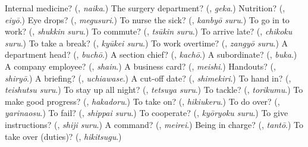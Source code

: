 \begin{tcolorbox}[breakable,colback=teal!4,colframe=teal!35!black,title={Before you move on}]
Internal medicine? (\textbf{}, \emph{naika}.) The surgery department? (\textbf{}, \emph{geka}.) Nutrition? (\textbf{}, \emph{eiyō}.) Eye drops? (\textbf{}, \emph{megusuri}.) To nurse the sick? (\textbf{}, \emph{kanbyō suru}.) To go in to work? (\textbf{}, \emph{shukkin suru}.) To commute? (\textbf{}, \emph{tsūkin suru}.) To arrive late? (\textbf{}, \emph{chikoku suru}.) To take a break? (\textbf{}, \emph{kyūkei suru}.) To work overtime? (\textbf{}, \emph{zangyō suru}.) A department head? (\textbf{}, \emph{buchō}.) A section chief? (\textbf{}, \emph{kachō}.) A subordinate? (\textbf{}, \emph{buka}.) A company employee? (\textbf{}, \emph{shain}.) A business card? (\textbf{}, \emph{meishi}.) Handouts? (\textbf{}, \emph{shiryō}.) A briefing? (\textbf{}, \emph{uchiawase}.) A cut-off date? (\textbf{}, \emph{shimekiri}.) To hand in? (\textbf{}, \emph{teishutsu suru}.) To stay up all night? (\textbf{}, \emph{tetsuya suru}.) To tackle? (\textbf{}, \emph{torikumu}.) To make good progress? (\textbf{}, \emph{hakadoru}.) To take on? (\textbf{}, \emph{hikiukeru}.) To do over? (\textbf{}, \emph{yarinaosu}.) To fail? (\textbf{}, \emph{shippai suru}.) To cooperate? (\textbf{}, \emph{kyōryoku suru}.) To give instructions? (\textbf{}, \emph{shiji suru}.) A command? (\textbf{}, \emph{meirei}.) Being in charge? (\textbf{}, \emph{tantō}.) To take over (duties)? (\textbf{}, \emph{hikitsugu}.)
\end{tcolorbox}
